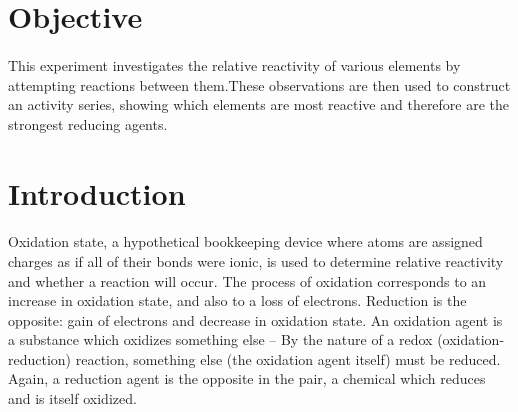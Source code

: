 \documentclass[fleqn,titlepage]{article}
\begin{document}
\section*{Objective}
  \paragraph{} This experiment investigates the relative reactivity of various elements by attempting reactions between them.These observations are then used to construct an activity series, showing which elements are most reactive and therefore are the strongest reducing agents.

\section*{Introduction}
  \paragraph{} Oxidation state, a hypothetical bookkeeping device where atoms are assigned charges as if all of their bonds were ionic, is used to determine relative reactivity and whether a reaction will occur. The process of oxidation corresponds to an increase in oxidation state, and also to a loss of electrons. Reduction is the opposite: gain of electrons and decrease in oxidation state. An oxidation agent is a substance which oxidizes something else -- By the nature of a redox (oxidation-reduction) reaction, something else (the oxidation agent itself) must be reduced. Again, a reduction agent is the opposite in the pair, a chemical which reduces and is itself oxidized.

\newpage
\end{document}
